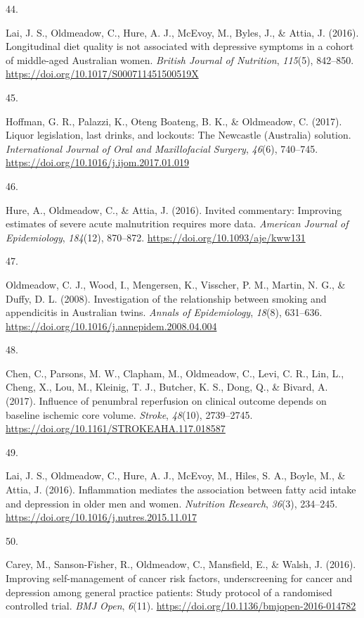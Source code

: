 \documentclass[11pt, a4paper]{awesome-cv}
\newlength{\csllabelwidth}
\newcommand{\CSLLeftMargin}[1]{\parbox[t]{\csllabelwidth}{#1}}
\newcommand{\CSLRightInline}[1]{\parbox[t]{\linewidth - \csllabelwidth}{#1}}
\begin{document}
\leavevmode\hypertarget{ref-lai_longitudinal_2016}{}%
\CSLLeftMargin{44. }
\CSLRightInline{Lai, J. S., Oldmeadow, C., Hure, A. J., McEvoy, M.,
Byles, J., \& Attia, J. (2016). Longitudinal diet quality is not
associated with depressive symptoms in a cohort of middle-aged
Australian women. \emph{British Journal of Nutrition}, \emph{115}(5),
842--850. \url{https://doi.org/10.1017/S000711451500519X}}

\leavevmode\hypertarget{ref-hoffman_liquor_2017}{}%
\CSLLeftMargin{45. }
\CSLRightInline{Hoffman, G. R., Palazzi, K., Oteng Boateng, B. K., \&
Oldmeadow, C. (2017). Liquor legislation, last drinks, and lockouts: The
Newcastle (Australia) solution. \emph{International Journal of Oral and
Maxillofacial Surgery}, \emph{46}(6), 740--745.
\url{https://doi.org/10.1016/j.ijom.2017.01.019}}

\leavevmode\hypertarget{ref-hure_invited_2016}{}%
\CSLLeftMargin{46. }
\CSLRightInline{Hure, A., Oldmeadow, C., \& Attia, J. (2016). Invited
commentary: Improving estimates of severe acute malnutrition requires
more data. \emph{American Journal of Epidemiology}, \emph{184}(12),
870--872. \url{https://doi.org/10.1093/aje/kww131}}

\leavevmode\hypertarget{ref-oldmeadow_investigation_2008}{}%
\CSLLeftMargin{47. }
\CSLRightInline{Oldmeadow, C. J., Wood, I., Mengersen, K., Visscher, P.
M., Martin, N. G., \& Duffy, D. L. (2008). Investigation of the
relationship between smoking and appendicitis in Australian twins.
\emph{Annals of Epidemiology}, \emph{18}(8), 631--636.
\url{https://doi.org/10.1016/j.annepidem.2008.04.004}}

\leavevmode\hypertarget{ref-chen_influence_2017}{}%
\CSLLeftMargin{48. }
\CSLRightInline{Chen, C., Parsons, M. W., Clapham, M., Oldmeadow, C.,
Levi, C. R., Lin, L., Cheng, X., Lou, M., Kleinig, T. J., Butcher, K.
S., Dong, Q., \& Bivard, A. (2017). Influence of penumbral reperfusion
on clinical outcome depends on baseline ischemic core volume.
\emph{Stroke}, \emph{48}(10), 2739--2745.
\url{https://doi.org/10.1161/STROKEAHA.117.018587}}

\leavevmode\hypertarget{ref-lai_inflammation_2016}{}%
\CSLLeftMargin{49. }
\CSLRightInline{Lai, J. S., Oldmeadow, C., Hure, A. J., McEvoy, M.,
Hiles, S. A., Boyle, M., \& Attia, J. (2016). Inflammation mediates the
association between fatty acid intake and depression in older men and
women. \emph{Nutrition Research}, \emph{36}(3), 234--245.
\url{https://doi.org/10.1016/j.nutres.2015.11.017}}

\leavevmode\hypertarget{ref-carey_improving_2016}{}%
\CSLLeftMargin{50. }
\CSLRightInline{Carey, M., Sanson-Fisher, R., Oldmeadow, C., Mansfield,
E., \& Walsh, J. (2016). Improving self-management of cancer risk
factors, underscreening for cancer and depression among general practice
patients: Study protocol of a randomised controlled trial. \emph{BMJ
Open}, \emph{6}(11). \url{https://doi.org/10.1136/bmjopen-2016-014782}}
\end{document}
